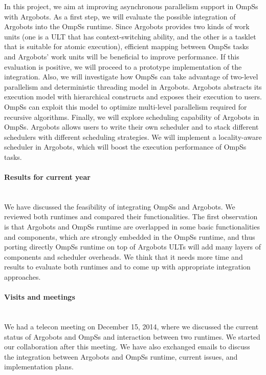 \begin{refsection}
In this project, we aim at improving asynchronous parallelism support in OmpSs
with Argobots. As a first step, we will evaluate the possible integration of
Argobots into the OmpSs runtime. Since Argobots provides two kinds of work units
(one is a ULT that has context-switching ability, and the other is a tasklet
that is suitable for atomic execution), efficient mapping between OmpSs tasks
and Argobots’ work units will be beneficial to improve performance. If this
evaluation is positive, we will proceed to a prototype implementation of the
integration. Also, we will investigate how OmpSs can take advantage of two-level
parallelism and deterministic threading model in Argobots. Argobots abstracts
its execution model with hierarchical constructs and exposes their execution to
users. OmpSs can exploit this model to optimize multi-level parallelism required
for recursive algorithms. Finally, we will explore scheduling capability of
Argobots in OmpSs. Argobots allows users to write their own scheduler and to
stack different schedulers with different scheduling strategies. We will
implement a locality-aware scheduler in Argobots, which will boost the execution
performance of OmpSs tasks.


\paragraph{Results for current year}~\\

We have discussed the feasibility of integrating OmpSs and Argobots. We reviewed
both runtimes and compared their functionalities. The first observation is that
Argobots and OmpSs runtime are overlapped in some basic functionalities and
components, which are strongly embedded in the OmpSs runtime, and thus porting
directly OmpSs runtime on top of Argobots ULTs will add many layers of
components and scheduler overheads. We think that it needs more time and results
to evaluate both runtimes and to come up with appropriate integration
approaches.


\paragraph{Visits and meetings}~\\

We had a telecon meeting on December 15, 2014, where we discussed the current
status of Argobots and OmpSs and interaction between two runtimes. We started
our collaboration after this meeting. We have also exchanged emails to discuss
the integration between Argobots and OmpSs runtime, current issues, and
implementation plans.


\end{refsection}
